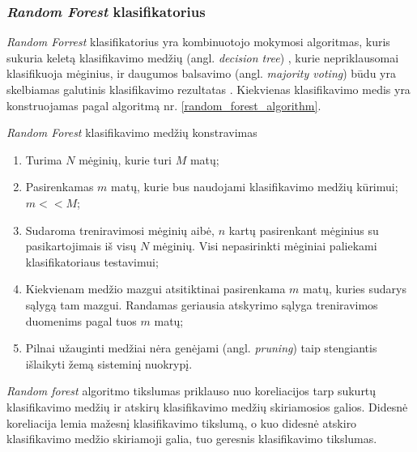 


\subsubsection{\textit{Random Forest} klasifikatorius}

\textit{Random Forrest} klasifikatorius yra kombinuotojo mokymosi algoritmas, kuris sukuria keletą klasifikavimo medžių (angl. \textit{decision tree}) \cite{DBLP:books/mk/HanK2000}, kurie  nepriklausomai klasifikuoja mėginius, ir daugumos balsavimo (angl. \textit{majority voting}) būdu yra skelbiamas galutinis klasifikavimo rezultatas \cite{breiman1984classification}. Kiekvienas klasifikavimo medis yra konstruojamas pagal algoritmą nr. \ref{random_forest_algorithm}.
\begin{algorithm}
 \caption{\textit{Random Forest} klasifikavimo medžių konstravimas}
 \label{random_forest_algorithm}
 \begin{enumerate}
  \item Turima $N$ mėginių, kurie turi $M$ matų;
  \item Pasirenkamas $m$ matų, kurie bus naudojami klasifikavimo medžių kūrimui; $m << M$;
  \item Sudaroma treniravimosi mėginių aibė, $n$ kartų pasirenkant mėginius su pasikartojimais iš visų $N$ mėginių. Visi nepasirinkti mėginiai paliekami klasifikatoriaus testavimui; 
  \item Kiekvienam medžio mazgui atsitiktinai pasirenkama $m$ matų, kuries sudarys sąlygą tam mazgui. Randamas geriausia atskyrimo sąlyga treniravimos duomenims pagal tuos $m$ matų;
  \item Pilnai užauginti medžiai nėra genėjami (angl. \textit{pruning}) taip stengiantis išlaikyti žemą sisteminį nuokrypį.
 \end{enumerate}
\end{algorithm}

\textit{Random forest} algoritmo tikslumas priklauso nuo koreliacijos tarp sukurtų klasifikavimo medžių ir atskirų klasifikavimo medžių skiriamosios galios. Didesnė koreliacija lemia mažesnį klasifikavimo tikslumą, o kuo didesnė atskiro klasifikavimo medžio skiriamoji galia, tuo geresnis klasifikavimo tikslumas.


